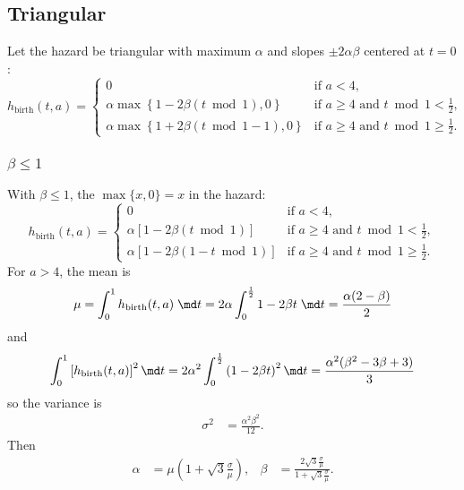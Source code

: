 \documentclass{jpmarticle}
\begin{document}
\subsection{Triangular}

Let the hazard be triangular with maximum $\alpha$ and slopes
$\pm 2 \alpha \beta$ centered at $t = 0$:
\begin{equation}
  h_{\mathrm{birth}} (t, a) =
  \begin{cases}
    0 & \text{if $a < 4$},
    \\
    \alpha \max\left\{1 - 2 \beta (t \bmod 1), 0\right\}
    & \text{if $a \geq 4$ and $t \bmod 1 < \frac{1}{2}$},
    \\
    \alpha \max\left\{1 + 2 \beta (t \bmod 1 - 1), 0\right\}
    & \text{if $a \geq 4$ and $t \bmod 1 \geq \frac{1}{2}$}.
  \end{cases}
\end{equation}

\subsubsection{$\beta \leq 1$}

With $\beta \leq 1$, the $\max\{x, 0\} = x$ in the hazard:
\begin{equation}
  h_{\mathrm{birth}} (t, a) =
  \begin{cases}
    0 & \text{if $a < 4$},
    \\
    \alpha \left[1 - 2 \beta (t \bmod 1)\right]
    & \text{if $a \geq 4$ and $t \bmod 1 < \frac{1}{2}$},
    \\
    \alpha \left[1 - 2 \beta (1 - t \bmod 1)\right]
    & \text{if $a \geq 4$ and $t \bmod 1 \geq \frac{1}{2}$}.
  \end{cases}
\end{equation}
For $a > 4$, the mean is
\begin{align}
  \mu = \int_0^1 h_{\mathrm{birth}}(t, a) \; \md t
  = 2 \alpha \int_0^{\frac{1}{2}} 1 - 2 \beta t \; \md t
  = \frac{\alpha (2 - \beta)}{2}
\end{align}
and
\begin{align}
  \int_0^1 \left[h_{\mathrm{birth}}(t, a)\right]^2 \md t
  = 2 \alpha^2 \int_0^{\frac{1}{2}} \left(1 - 2 \beta t\right)^2 \md t
  = \frac{\alpha^2 (\beta^2 - 3 \beta + 3)}{3}
\end{align}
so the variance is
\begin{align}
  \sigma^2
  &= \frac{\alpha^2 \beta^2}{12}.
\end{align}
Then
\begin{align}
  \alpha &= \mu \left(1 + \sqrt{3} \frac{\sigma}{\mu}\right),
  &
  \beta &= \frac{2 \sqrt{3} \frac{\sigma}{\mu}}
          {1 + \sqrt{3} \frac{\sigma}{\mu}}.
\end{align}
\end{document}
